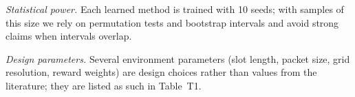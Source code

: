\emph{Statistical power.} Each learned method is trained with 10 seeds; with samples of
this size we rely on
permutation tests and bootstrap intervals and avoid strong claims when intervals overlap.

\emph{Design parameters.} Several environment parameters (slot length, packet size,
grid resolution, reward weights) are design choices rather than values from the
literature; they are listed as such in Table~T1.


%
